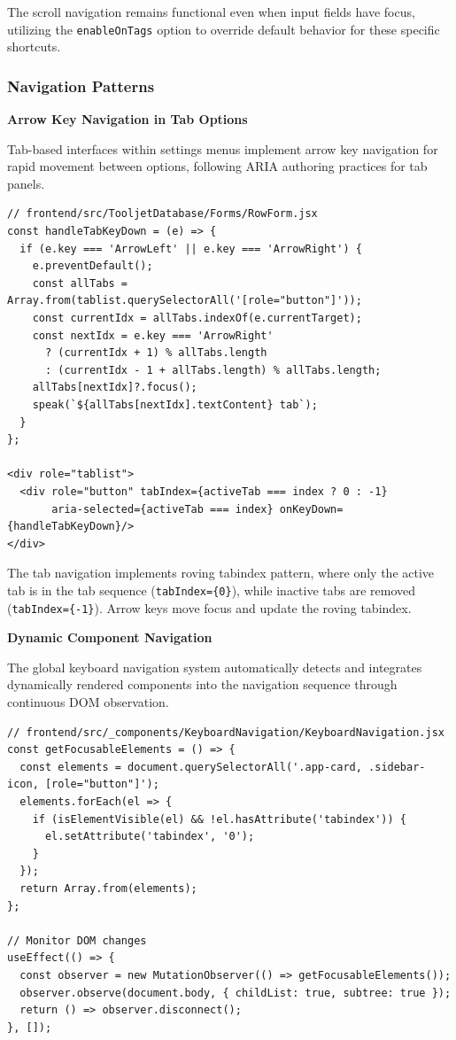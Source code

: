 The scroll navigation remains functional even when input fields have focus, utilizing the \texttt{enableOnTags} option to override default behavior for these specific shortcuts.

\subsubsection{Navigation Patterns}

\textbf{Arrow Key Navigation in Tab Options}

Tab-based interfaces within settings menus implement arrow key navigation for rapid movement between options, following ARIA authoring practices for tab panels.

\begin{lstlisting}[caption=Tab Options Arrow Key Navigation, label=lst:arrow-tabs]
// frontend/src/TooljetDatabase/Forms/RowForm.jsx
const handleTabKeyDown = (e) => {
  if (e.key === 'ArrowLeft' || e.key === 'ArrowRight') {
    e.preventDefault();
    const allTabs = Array.from(tablist.querySelectorAll('[role="button"]'));
    const currentIdx = allTabs.indexOf(e.currentTarget);
    const nextIdx = e.key === 'ArrowRight'
      ? (currentIdx + 1) % allTabs.length
      : (currentIdx - 1 + allTabs.length) % allTabs.length;
    allTabs[nextIdx]?.focus();
    speak(`${allTabs[nextIdx].textContent} tab`);
  }
};

<div role="tablist">
  <div role="button" tabIndex={activeTab === index ? 0 : -1} 
       aria-selected={activeTab === index} onKeyDown={handleTabKeyDown}/>
</div>
\end{lstlisting}

The tab navigation implements roving tabindex pattern, where only the active tab is in the tab sequence (\texttt{tabIndex=\{0\}}), while inactive tabs are removed (\texttt{tabIndex=\{-1\}}). Arrow keys move focus and update the roving tabindex.

\textbf{Dynamic Component Navigation}

The global keyboard navigation system automatically detects and integrates dynamically rendered components into the navigation sequence through continuous DOM observation.

\begin{lstlisting}[caption=Dynamic Component Navigation Integration, label=lst:dynamic-navigation]
// frontend/src/_components/KeyboardNavigation/KeyboardNavigation.jsx
const getFocusableElements = () => {
  const elements = document.querySelectorAll('.app-card, .sidebar-icon, [role="button"]');
  elements.forEach(el => {
    if (isElementVisible(el) && !el.hasAttribute('tabindex')) {
      el.setAttribute('tabindex', '0');
    }
  });
  return Array.from(elements);
};

// Monitor DOM changes
useEffect(() => {
  const observer = new MutationObserver(() => getFocusableElements());
  observer.observe(document.body, { childList: true, subtree: true });
  return () => observer.disconnect();
}, []);
\end{lstlisting}

